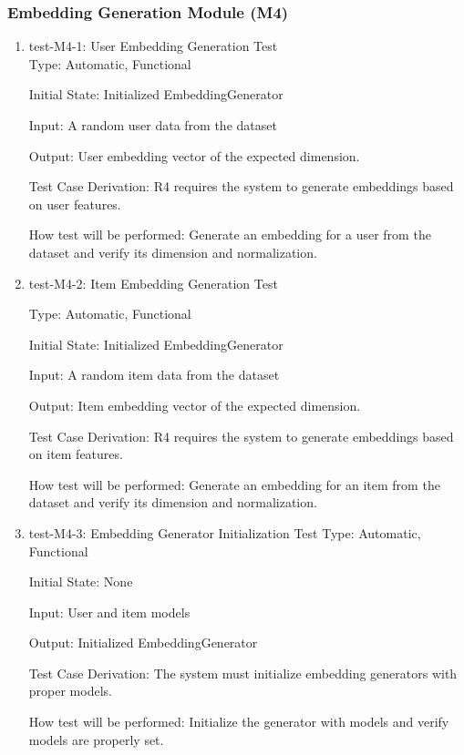 \documentclass[12pt, titlepage]{article}
\begin{document}
\subsubsection{Embedding Generation Module (M4)}
\begin{enumerate}

  \item{test-M4-1: User Embedding Generation Test\\}
  Type: Automatic, Functional
            
  Initial State: Initialized EmbeddingGenerator
            
  Input: A random user data from the dataset
            
  Output: User embedding vector of the expected dimension.
  
  Test Case Derivation: R4 requires the system to generate embeddings based on user features.
  
  How test will be performed: Generate an embedding for a user from the dataset and verify its dimension and normalization.

  \item{test-M4-2: Item Embedding Generation Test\\}
  
  Type: Automatic, Functional

  Initial State: Initialized EmbeddingGenerator

  Input: A random item data from the dataset

  Output: Item embedding vector of the expected dimension.

  Test Case Derivation: R4 requires the system to generate embeddings based on item features.

  How test will be performed: Generate an embedding for an item from the dataset and verify its dimension and normalization.

  \item{test-M4-3: Embedding Generator Initialization Test}
  Type: Automatic, Functional

  Initial State: None

  Input: User and item models

  Output: Initialized EmbeddingGenerator

  Test Case Derivation: The system must initialize embedding generators with proper models.

  How test will be performed: Initialize the generator with models and verify models are properly set.
  \end{enumerate}
\end{document}
